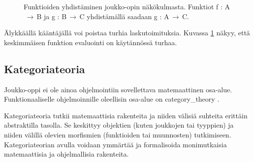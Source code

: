 \begin{figure}[htbp]
    \vspace{10pt}
    \caption{Funktioiden yhdistäminen joukko-opin näkökulmasta. Funktiot f : A$\,\to\,$B ja g : B$\,\to\,$C yhdistämällä saadaan g : A$\,\to\,$C.}
    \label{fig:function_composition_in_sets}
\end{figure}

Älykkäällä kääntäjällä voi poistaa turhia laskutoimituksia. Kuvassa \ref{fig:function_composition_in_sets} näkyy, että keskimmäisen funktion evaluointi on käytännössä turhaa.



\subsection{Kategoriateoria}


Joukko-oppi ei ole ainoa ohjelmointiin sovellettava matemaattinen osa-alue. Funktionaaliselle ohjelmoinnille oleellisin osa-alue on \gls{category_theory} \cite{bartosz_category_for_progamers,promises-spec-94}.

Kategoriateoria tutkii matemaattisia rakenteita ja niiden välisiä suhteita erittäin abstraktilla tasolla. Se keskittyy objektien (kuten joukkojen tai tyyppien) ja niiden välillä olevien morfismien (funktioiden tai muunnosten) tutkimiseen. Kategoriateorian avulla voidaan ymmärtää ja formalisoida monimutkaisia matemaattisia ja ohjelmallisia rakenteita. \citep{bartosz_category_for_progamers,promises-spec-94,category_theory}

